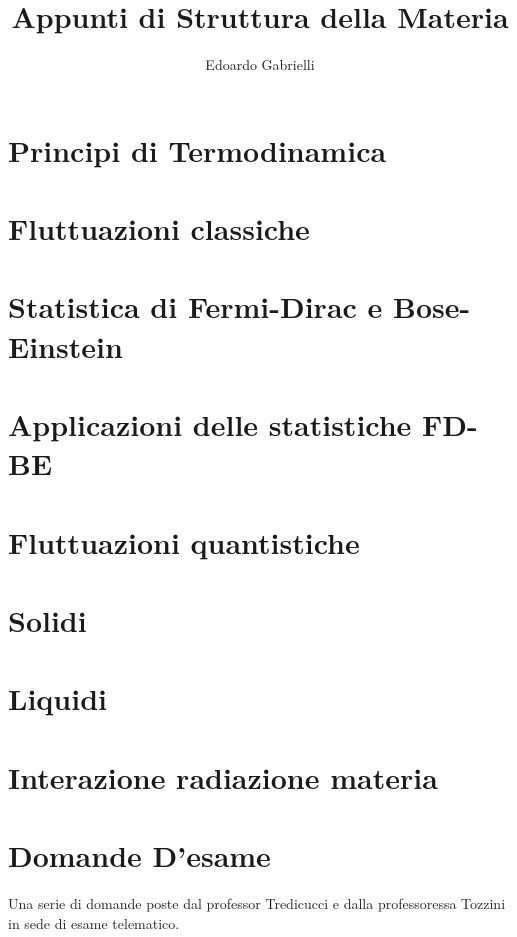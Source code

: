 

\author{Edoardo Gabrielli}
\title{Appunti di Struttura della Materia}


\maketitle
\clearpage
\tableofcontents
\chapter{Principi di Termodinamica}





\chapter{Fluttuazioni classiche}

\chapter{Statistica di Fermi-Dirac e Bose-Einstein}



\chapter{Applicazioni delle statistiche FD-BE}




\chapter{Fluttuazioni quantistiche}


\chapter{Solidi}



\chapter{Liquidi}





\chapter{Interazione radiazione materia}



 
\chapter{Domande D'esame}
Una serie di domande poste dal professor Tredicucci e dalla professoressa Tozzini in sede di esame telematico.
 

